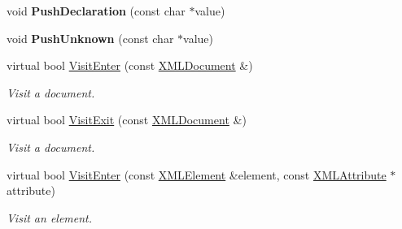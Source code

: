 \begin{DoxyCompactItemize}
\mbox{\label{classCPlantBox_1_1tinyxml2_1_1XMLPrinter_a9f11deb38ee4628889ec1205711bb13d}} 
void {\bfseries Push\+Declaration} (const char $\ast$value)
\item 
\mbox{\label{classCPlantBox_1_1tinyxml2_1_1XMLPrinter_a6c9e0ea83622482ff40c880467d3b64e}} 
void {\bfseries Push\+Unknown} (const char $\ast$value)
\item 
\mbox{\label{classCPlantBox_1_1tinyxml2_1_1XMLPrinter_a1bb76b61fe304ce7df03bd0498a3f687}} 
virtual bool \hyperlink{classCPlantBox_1_1tinyxml2_1_1XMLPrinter_a1bb76b61fe304ce7df03bd0498a3f687}{Visit\+Enter} (const \hyperlink{classCPlantBox_1_1tinyxml2_1_1XMLDocument}{X\+M\+L\+Document} \&)
\begin{DoxyCompactList}\small\item\em Visit a document. \end{DoxyCompactList}\item 
\mbox{\label{classCPlantBox_1_1tinyxml2_1_1XMLPrinter_a91d6930fc18e68f37ab7dfd85ba0b186}} 
virtual bool \hyperlink{classCPlantBox_1_1tinyxml2_1_1XMLPrinter_a91d6930fc18e68f37ab7dfd85ba0b186}{Visit\+Exit} (const \hyperlink{classCPlantBox_1_1tinyxml2_1_1XMLDocument}{X\+M\+L\+Document} \&)
\begin{DoxyCompactList}\small\item\em Visit a document. \end{DoxyCompactList}\item 
\mbox{\label{classCPlantBox_1_1tinyxml2_1_1XMLPrinter_a2d8d2fafd2a8266fe3d88581e4cb2792}} 
virtual bool \hyperlink{classCPlantBox_1_1tinyxml2_1_1XMLPrinter_a2d8d2fafd2a8266fe3d88581e4cb2792}{Visit\+Enter} (const \hyperlink{classCPlantBox_1_1tinyxml2_1_1XMLElement}{X\+M\+L\+Element} \&element, const \hyperlink{classCPlantBox_1_1tinyxml2_1_1XMLAttribute}{X\+M\+L\+Attribute} $\ast$attribute)
\begin{DoxyCompactList}\small\item\em Visit an element. \end{DoxyCompactList}\item 
\mbox{\label{classCPlantBox_1_1tinyxml2_1_1XMLPrinter_a7912278a46597405505b53e25549aa5f}} 

\end{DoxyCompactItemize}
